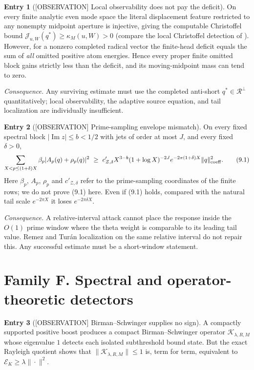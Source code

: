 \documentclass[11pt]{amsart}
\theoremstyle{definition}
\newcounter{family}
\newtheorem{entry}{Entry}[family]
\theoremstyle{remark}
\newcommand{\EK}{\mathscr E_K}
\newcommand{\OBS}{\textup{[OBSERVATION]}}
\begin{document}
\begin{entry}[\OBS{} Local observability does not pay the deficit]
\label{ent:E6}
On every finite analytic even mode space the literal displacement feature
restricted to any nonempty midpoint aperture is injective, giving the
computable Christoffel bound
\(\mathcal J_{u,W}(q^*)\ge\kappa_M(u,W)>0\) (compare the local Christoffel
detection of \cite[Proposition~9.9]{TrejoPizzo40}).  However, for a nonzero
completed radical vector the finite-head deficit equals the sum of
\emph{all} omitted positive atom energies.  Hence every proper finite
omitted block gains strictly less than the deficit, and its
moving-midpoint mass can tend to zero.
\end{entry}

\emph{Consequence.} Any surviving estimate must use the completed
anti-short \(q^*\in\mathcal R^\perp\) quantitatively; local observability,
the adaptive source equation, and tail localization are individually
insufficient.

\begin{entry}[\OBS{} Prime-sampling envelope mismatch]
\label{ent:E7}
On every fixed spectral block \(|\operatorname{Im}z|\le b<1/2\) with jets
of order at most \(J\), and every fixed \(\delta>0\),
\[
 \sum_{X<p\le(1+\delta)X}\beta_p|A_p(q)+\rho_p(q)|^2
 \ \ge\ c'_{\mathcal Z,\delta}X^{3-b}(1+\log X)^{-2J}
 e^{-2\pi(1+\delta)X}\|q\|_{\rm coeff}^2 .
\tag{9.1}
\]
Here \(\beta_p\), \(A_p\), \(\rho_p\) and \(c'_{\mathcal Z,\delta}\)
refer to the prime-sampling coordinates of the finite rows; we do not
prove (9.1) here.  Even if (9.1) holds, compared with the natural tail
scale \(e^{-2\pi X}\) it loses \(e^{-2\pi\delta X}\).
\end{entry}

\emph{Consequence.} A relative-interval attack cannot place the response
inside the \(O(1)\) prime window where the theta weight is comparable to
its leading tail value.  Remez and Tur\'an localization on the same
relative interval do not repair this.  Any successful estimate must be a
short-window statement.

\section{Family F. Spectral and operator-theoretic detectors}

\begin{entry}[\OBS{} Birman--Schwinger supplies no sign]
\label{ent:F1}
A compactly supported positive boost produces a compact
Birman--Schwinger operator \(\mathcal K_{\lambda,R,M}\) whose eigenvalue
\(1\) detects each isolated subthreshold bound state.  But the exact
Rayleigh quotient shows that \(\|\mathcal K_{\lambda,R,M}\|\le1\) is,
term for term, equivalent to \(\EK\ge\lambda\|\cdot\|^2\).
\end{entry}
\end{document}
